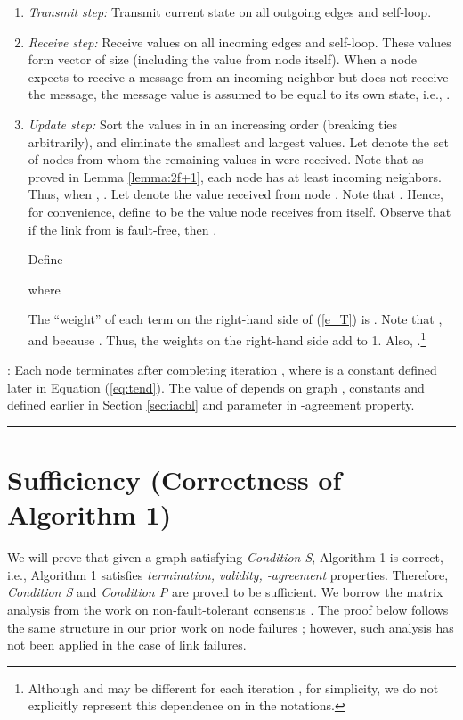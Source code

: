 \documentclass{llncs}
\begin{document}
\begin{enumerate}

\item {\em Transmit step:} Transmit current state  on all outgoing edges and self-loop.

\item {\em Receive step:} Receive values on all incoming edges and self-loop. These values form vector  of size  (including the value from node  itself). When a node expects to receive a message from an incoming neighbor but does not receive the message, the message value is assumed to be equal to its own state, i.e., .

\item {\em Update step:}
Sort the values in  in an increasing order (breaking ties arbitrarily), and eliminate the smallest and largest  values. 
Let  denote the set of nodes from whom the remaining  values in  were received. Note that as proved in Lemma \ref{lemma:2f+1}, each node has at least  incoming neighbors. Thus, when , .
Let  denote the value received from node . Note that . Hence, for convenience, define  to be the value node  receives from itself.  Observe that
if the link from  is fault-free, then .

Define

where
 

The ``weight'' of each term on the right-hand side of
(\ref{e_T}) is . Note that , and  because . Thus, the weights on the right-hand side add to 1. Also, .\footnote{Although  and  may be different for each iteration , for simplicity, we do not explicitly represent this dependence on  in the notations.} 




\end{enumerate}

: Each node terminates after completing iteration , where  is a constant defined later in Equation (\ref{eq:tend}). The value of  depends on graph , constants  and  defined earlier in Section \ref{sec:iacbl} and parameter  in -agreement property.

\hrule



\section{Sufficiency (Correctness of Algorithm 1)}
\label{s:sufficiency}

We will prove that given a graph  satisfying {\em Condition S}, Algorithm 1 is correct, i.e., Algorithm 1 satisfies {\em termination, validity, -agreement} properties. Therefore, {\em Condition S} and {\em Condition P} are proved to be sufficient. We borrow the matrix analysis from the work on non-fault-tolerant consensus \cite{Jadbabaie,AA_convergence_markov}. The proof below follows the same structure in our prior work on node failures \cite{Tseng_general,vaidya_icdcn14}; however, such analysis has not been applied in the case of link failures.
\end{document}
